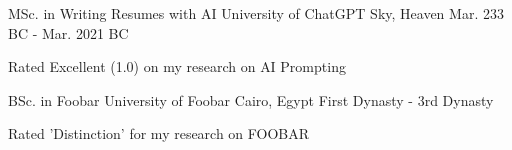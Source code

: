 


\begin{cventries}


\cventry
{MSc. in Writing Resumes with AI} %
{University of ChatGPT} %
{Sky, Heaven} %
{Mar. 233 BC - Mar. 2021 BC} %
{ %
    \begin{cvitems}{}
    \item {Rated Excellent (1.0) on my research on AI Prompting}
    \end{cvitems}
}



\cventry
{BSc. in Foobar} %
{University of Foobar} %
{Cairo, Egypt} %
{First Dynasty - 3rd Dynasty} %
{ %
    \begin{cvitems}{}
    \item {Rated 'Distinction' for my research on FOOBAR}
    \end{cvitems}
}


\end{cventries}
